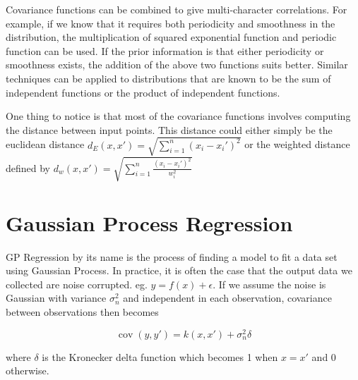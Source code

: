 \documentclass[11pt]{report}
\numberwithin{equation}{chapter}
\begin{document}
\begin{spacing}{2}
Covariance functions can be combined to give multi-character correlations. For example, if we know that it requires both periodicity and smoothness in the distribution, the multiplication of squared exponential function and periodic function can be used. If the prior information is that either periodicity or smoothness exists, the addition of the above two functions suits better. Similar techniques can be applied to distributions that are known to be the sum of independent functions or the product of independent functions.

One thing to notice is that most of the covariance functions involves computing the distance between input points. This distance could either simply be the euclidean distance $d_E(x,x\prime) = \sqrt{\sum\limits_{i=1}^n(x_i - x_i\prime)^2}$ or the weighted distance defined by $d_w(x,x\prime) = \sqrt{\sum\limits_{i=1}^n\frac{(x_i - x_i\prime)^2}{w_i^2}}$


\section{Gaussian Process Regression}

GP Regression by its name is the process of finding a model to fit a data set using Gaussian Process. In practice, it is often the case that the output data we collected are noise corrupted. eg. $y = f(x)+ \epsilon$. If we assume the noise is Gaussian with variance $\sigma_n^2$ and independent in each observation, covariance between observations then becomes

\begin{equation}
\label{cov_y}
\operatorname{cov}(y,y\prime) = k(x,x\prime) + \sigma_n^2\delta
\end{equation}

where $\delta$ is the Kronecker delta function which becomes 1 when $x = x\prime$ and 0 otherwise.


\end{spacing}
\end{document}
